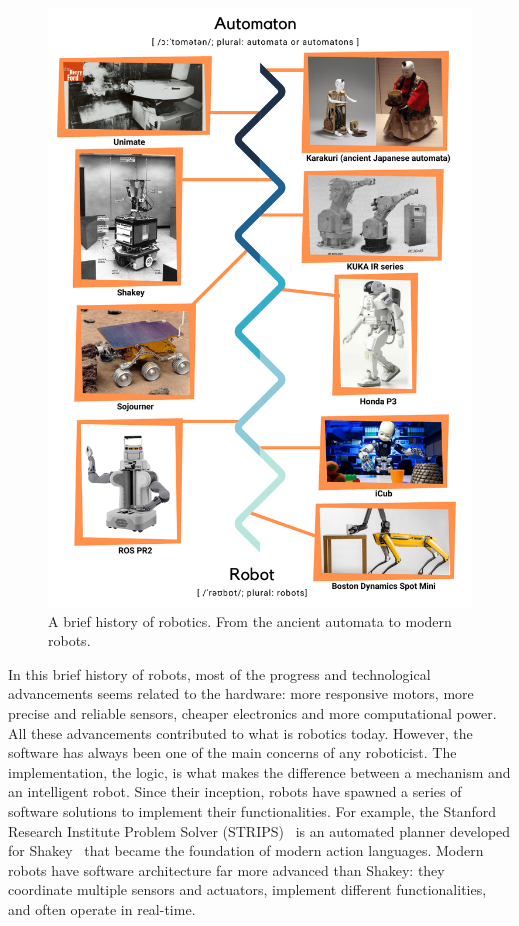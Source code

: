 \begin{figure}
    \centering
    \includegraphics[width=\textwidth]{gfx/history}
    \caption{A brief history of robotics. From the ancient automata to modern robots.}\label{fig:history}
\end{figure}

In this brief history of robots, most of the progress and technological advancements seems related to the hardware: more responsive motors, more precise and reliable sensors, cheaper electronics and more computational power. All these advancements contributed to what is robotics today. However, the software has always been one of the main concerns of any roboticist. The implementation, the logic, is what makes the difference between a mechanism and an intelligent robot. Since their inception, robots have spawned a series of software solutions to implement their functionalities. For example, the Stanford Research Institute Problem Solver (STRIPS)~\cite{lifschitz1987semantics} is an automated planner developed for Shakey~\cite{nilsson1984shakey} that became the foundation of modern action languages. Modern robots have software architecture far more advanced than Shakey: they coordinate multiple sensors and actuators,  implement different functionalities, and often operate in real-time.

